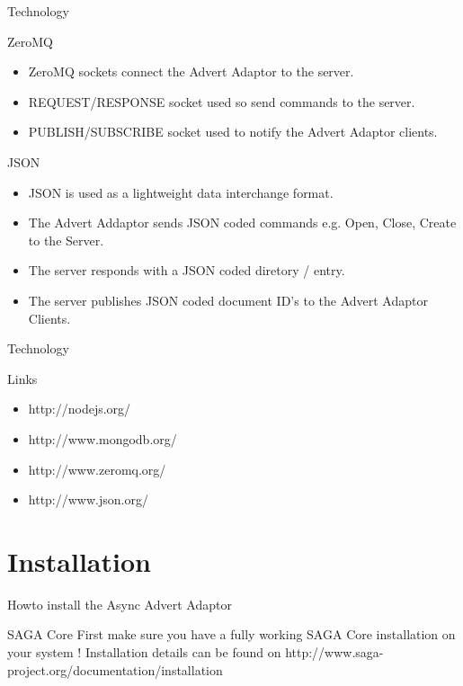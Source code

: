 \documentclass{beamer}
\begin{document}
    \begin{frame}{Technology}
      \begin{block}{ZeroMQ}
        \begin{itemize}
          \item ZeroMQ sockets connect the Advert Adaptor to the server.
          \item REQUEST/RESPONSE socket used so send commands to the server.
          \item PUBLISH/SUBSCRIBE socket used to notify the Advert Adaptor clients.
        \end{itemize}
      \end{block}
      
      \begin{block}{JSON}
        \begin{itemize}
          \item JSON is used as a lightweight data interchange format.
          \item The Advert Addaptor sends JSON coded commands e.g. Open, Close, Create to the Server.
          \item The server responds with a JSON coded diretory / entry. 
          \item The server publishes JSON coded document ID's to the Advert Adaptor Clients. 
        \end{itemize}
      \end{block}
    \end{frame}
    
    \begin{frame}{Technology}
      \begin{block}{Links}
        \begin{itemize}
          \item http://nodejs.org/
          \item http://www.mongodb.org/
          \item http://www.zeromq.org/
          \item http://www.json.org/
        \end{itemize}
      \end{block}
    \end{frame}
    
  \section{Installation}
    \begin{frame}{Howto install the Async Advert Adaptor}
       \begin{alertblock}{SAGA Core}
         First make sure you have a fully working SAGA Core installation on your system ! 
         Installation details can be found on http://www.saga-project.org/documentation/installation
       \end{alertblock}
    \end{frame}
    
\end{document}
